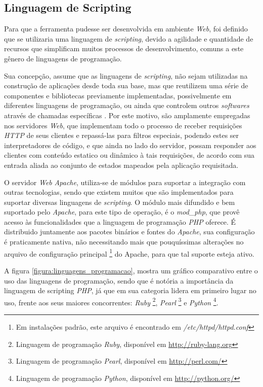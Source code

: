 \subsection{Linguagem de Scripting}

Para que a ferramenta pudesse ser desenvolvida em ambiente \textit{Web}, foi definido que se utilizaria uma linguagem de \textit{scripting}, devido a agilidade e quantidade de recursos que simplificam muitos processos de desenvolvimento, comuns a este gênero de linguagens de programação.

Sua concepção, assume que as linguagens de \textit{scripting}, não sejam utilizadas na construção de aplicações desde toda sua base, mas que reutilizem uma série de componentes e bibliotecas previamente implementadas, possivelmente em diferentes linguagens de programação, ou ainda que controlem outros \textit{softwares} através de chamadas específicas \cite{Scripting}. Por este motivo, são amplamente empregadas nos servidores \textit{Web}, que implementam todo o processo de receber requisições \textit{HTTP} de seus clientes e repassá-las para filtros especiais, podendo estes ser interpretadores de código, e que ainda no lado do servidor, possam responder aos clientes com conteúdo estatico ou dinâmico à tais requisições, de acordo com sua entrada aliada ao conjunto de estados mapeados pela aplicação requisitada.

O servidor \textit{Web} \textit{Apache}, utiliza-se de módulos para suportar a integração com outras tecnologias, sendo que existem muitos que são implementados para suportar diversas linguagens de \textit{scripting}. O módulo mais difundido e bem suportado pelo \textit{Apache}, para este tipo de operação, é o \textit{mod\_php}, que provê acesso às funcionalidades que a linguagem de programação \textit{PHP} oferece. É distribuido juntamente aos pacotes binários e fontes do \textit{Apache}, sua configuração é praticamente nativa, não necessitando mais que pouquíssimas alterações no arquivo de configuração principal \footnote{Em instalações padrão, este arquivo é encontrado em \textit{/etc/httpd/httpd.conf}} do Apache, para que tal suporte esteja ativo.

A figura \ref{figura:linguagens_programacao}, mostra um gráfico comparativo entre o uso das linguagens de programação, sendo que é notória a importância da linguagem de scripting \textit{PHP}, já que em sua categoria lidera em primeiro lugar no uso, frente aos seus maiores concorrentes: \textit{Ruby} \footnote{Linguagem de programação \textit{Ruby}, disponível em \url{http://ruby-lang.org}}, \textit{Pearl} \footnote{Linguagem de programação \textit{Pearl}, disponível em \url{http://perl.com/}} e \textit{Python} \footnote{Linguagem de programação \textit{Python}, disponível em \url{http://python.org/}}.

